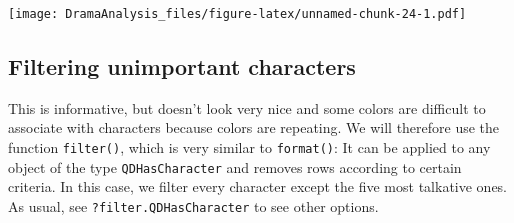 \documentclass[]{book}
\newenvironment{Shaded}{\begin{snugshade}}{\end{snugshade}}
\newcommand{\CommentTok}[1]{\textcolor[rgb]{0.56,0.35,0.01}{\textit{#1}}}
\newcommand{\DataTypeTok}[1]{\textcolor[rgb]{0.13,0.29,0.53}{#1}}
\newcommand{\DecValTok}[1]{\textcolor[rgb]{0.00,0.00,0.81}{#1}}
\newcommand{\FloatTok}[1]{\textcolor[rgb]{0.00,0.00,0.81}{#1}}
\newcommand{\KeywordTok}[1]{\textcolor[rgb]{0.13,0.29,0.53}{\textbf{#1}}}
\newcommand{\NormalTok}[1]{#1}
\newcommand{\OperatorTok}[1]{\textcolor[rgb]{0.81,0.36,0.00}{\textbf{#1}}}
\newcommand{\StringTok}[1]{\textcolor[rgb]{0.31,0.60,0.02}{#1}}
\begin{document}
\texttt{[image: DramaAnalysis\_files/figure-latex/unnamed-chunk-24-1.pdf]}

\hypertarget{filter}{%
\subsection{Filtering unimportant characters}\label{filter}}

This is informative, but doesn't look very nice and some colors are difficult to associate with characters because colors are repeating. We will therefore use the function \texttt{filter()}, which is very similar to \texttt{format()}: It can be applied to any object of the type \texttt{QDHasCharacter} and removes rows according to certain criteria. In this case, we filter every character except the five most talkative ones. As usual, see \texttt{?filter.QDHasCharacter} to see other options.

\begin{Shaded}
\end{Shaded}
\end{document}

